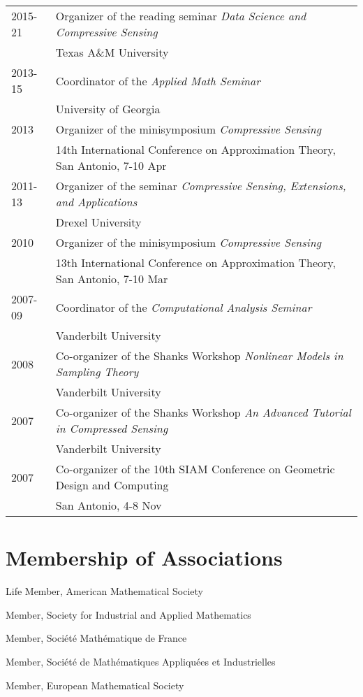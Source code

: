 \documentclass[11pt]{article}
\begin{document}
\begin{tabular}{ll}
2015-21 & Organizer of the reading seminar {\sl Data Science and Compressive Sensing}\\
& Texas A\&M University\\
2013-15 & Coordinator of the {\sl Applied Math Seminar}\\
& University of Georgia\\
2013 & Organizer of the minisymposium {\sl Compressive Sensing}\\
& 14th International Conference on Approximation Theory, San Antonio, 7-10 Apr\\
2011-13 & Organizer of the seminar {\sl Compressive Sensing, Extensions, and Applications}\\
& Drexel University\\
2010 & Organizer of the minisymposium {\sl Compressive Sensing}\\
& 13th International Conference on Approximation Theory, San Antonio, 7-10 Mar\\
2007-09 & Coordinator of the {\sl Computational Analysis Seminar}\\
& Vanderbilt University\\
2008 & Co-organizer of the Shanks Workshop {\sl Nonlinear Models in Sampling Theory}\\
& Vanderbilt University\\
2007 & Co-organizer of the Shanks Workshop {\sl An Advanced Tutorial in Compressed Sensing}\\
& Vanderbilt University\\
2007 &  Co-organizer of the 10th SIAM Conference on Geometric Design and Computing\\
& San Antonio, 4-8 Nov
\end{tabular}



\section{Membership of Associations}

\bitemize
\item Life Member, American Mathematical Society
\item Member, Society for Industrial and Applied Mathematics
\item Member, Soci\'{e}t\'{e} Math\'{e}matique de France
\item Member, Soci\'et\'e de Math\'ematiques Appliqu\'ees et Industrielles
\item Member, European Mathematical Society
\eitemize
\end{document}
